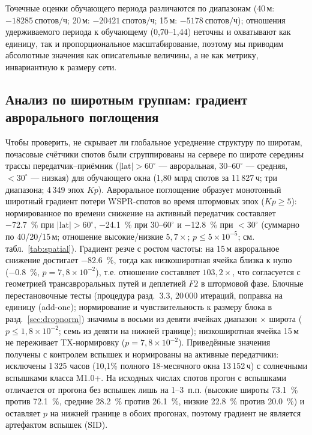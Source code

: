 \documentclass{agujournal2019}
\begin{document}
Точечные оценки обучающего периода различаются по диапазонам
(40\,м: $\SI{-18285}{\mbox{спотов/ч}}$; 20\,м: $\SI{-20421}{\mbox{спотов/ч}}$;
15\,м: $\SI{-5178}{\mbox{спотов/ч}}$); отношения удерживаемого периода к обучающему
(0,70--1,44) неточны и охватывают как единицу, так и пропорциональное
масштабирование, поэтому мы приводим абсолютные значения как описательные
величины, а не как метрику, инвариантную к размеру сети.


\subsection{Анализ по широтным группам: градиент аврорального поглощения}
\label{sec:spatial}

Чтобы проверить, не скрывает ли глобальное усреднение структуру по
широтам, почасовые счётчики спотов были сгруппированы на сервере по
широте середины трассы передатчик--приёмник
($|\mathrm{lat}| > 60^\circ$ --- авроральная, $30$--$60^\circ$ ---
средняя, $< 30^\circ$ --- низкая) для обучающего окна (1,80 млрд
спотов за 11\,827\,ч; три диапазона; 4\,349 эпох $Kp$). Авроральное
поглощение образует монотонный широтный градиент потери WSPR-спотов
во время штормовых эпох ($Kp \ge 5$): нормированное по времени снижение на активный передатчик составляет
\SI{-72,7}{\percent} при
$|\mathrm{lat}| > 60^\circ$, \SI{-24,1}{\percent} при
$30$--$60^\circ$ и \SI{-12,8}{\percent} при $< 30^\circ$ (суммарно по
40/20/15\,м; отношение высокие/низкие $5{,}7\times$; $p \le 5 \times 10^{-5}$;
см. табл.~\ref{tab:spatial}). Градиент резче с ростом частоты: на 15\,м авроральное снижение
достигает \SI{-82,6}{\percent}, тогда как
низкоширотная ячейка близка к нулю (\SI{-0,8}{\percent},
$p = 7{,}8 \times 10^{-2}$), т.е. отношение составляет
$103{,}2\times$,
что согласуется с геометрией трансавроральных путей и деплетией $F2$
в штормовой фазе. Блочные перестановочные тесты (процедура
разд.~3.3, 20\,000 итераций, поправка на единицу (add-one); нормирование и
чувствительность к размеру блока в разд.~\ref{sec:dropnorm})
значимы в восьми из девяти ячейках диапазон $\times$ широта
($p \le 1{,}8 \times 10^{-2}$; семь из девяти на нижней границе);
низкоширотная ячейка 15\,м не переживает TX-нормировку
($p = 7{,}8 \times 10^{-2}$).
Приведённые значения получены с контролем вспышек и нормированы на
активные передатчики: исключены 1\,325 часов (10,1\% полного
18-месячного окна 13\,152\,ч) с солнечными вспышками класса M1.0+.
На исходных числах спотов прогон
с вспышками отличается от прогона без вспышек лишь на 1--3~п.п.
(высокие широты \SI{73,1}{\percent} против \SI{72,1}{\percent},
средние \SI{28,2}{\percent} против \SI{26,1}{\percent}, низкие
\SI{22,8}{\percent} против \SI{20,0}{\percent}) и оставляет $p$
на нижней границе в обоих прогонах, поэтому градиент не является
артефактом вспышек (SID).
\end{document}
